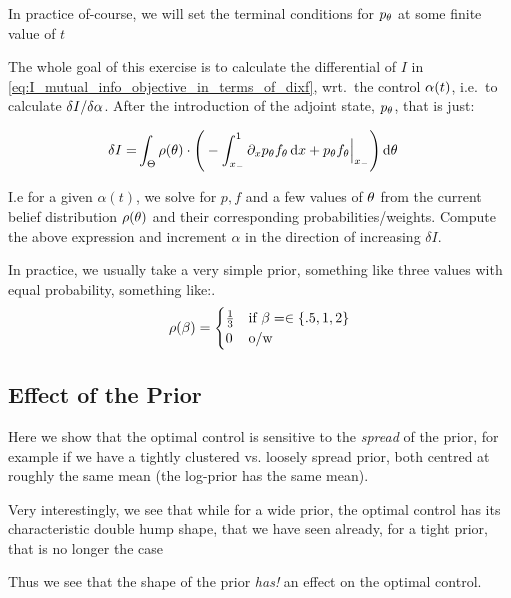 \documentclass{article}
\begin{document}
In practice of-course, we will set the terminal conditions for $p_{\theta}$ at some
finite value of $t$

\vskip10pt The whole goal of this exercise is to calculate the differential of
$I$ in \cref{eq:I_mutual_info_objective_in_terms_of_dixf},
wrt.\ the control ${\alpha}(t)$, i.e.\ to calculate $\delta I / \delta {\alpha}$. After the
introduction of the adjoint state, $p_{\theta}$, that is just:

 
\begin{align*}
\delta I =&   
\int_\Theta  \rho({\theta}) \cdot \Bigg(  
- \int_{ x_{-} }^{1} {\partial}_x p_{\theta} f_{\theta} \, \mathrm{d} x + 
   p_{\theta} f_{\theta} \Big|_{ x_{-} } 
    \Bigg) \, \mathrm{d} {\theta}
\end{align*}

I.e for a given $\alpha(t)$, we solve for $p,f$ and a few values of ${\theta}$ from
the current belief distribution $\rho({\theta})$ and their corresponding
probabilities/weights. Compute the above expression and increment $\alpha$ in
the direction of increasing $\delta I$.

In practice, we usually take a very simple prior, something like three values
with equal probability, something like:.
\begin{equation}
\rho({\beta}) = 
\begin{cases}
	\tfrac 13 & \textrm{if } {\beta}= \in \{.5,    1 ,  2 \}\\
	0   &\textrm{o/w }
\end{cases}
\label{eq:basic_prior_over_tau}
\end{equation} 

\subsection{Effect of the Prior}

Here we show that the optimal control is sensitive to the {\sl spread} of the
prior, for example if we have a tightly clustered vs. loosely spread prior, both
centred at roughly the same mean (the log-prior has the same mean). 

Very interestingly, we see that while for a wide prior, the optimal control has
its characteristic double hump shape, that we have seen already, for a tight
prior, that is no longer the case

Thus we see that the shape of the prior {\sl has!}
an effect on the optimal control.
\end{document}
